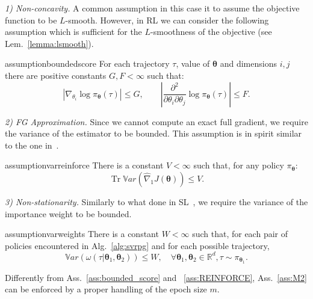 \documentclass{article}
\theoremstyle{remark}
\theoremstyle{definition}
\newcommand{\todopir}[1]{\todo[color=blued, inline]{\small #1}}
\newcommand{\realspace}{\mathbb R}      %
\DeclareMathOperator{\Tr}{Tr}
\newcommand{\vtheta}{\boldsymbol{\theta}}
\newcommand{\pol}{\pi_{\vtheta}}
\newcommand{\gradApp}[2]{\widehat{\nabla}_{#2}J(#1)}
\newcommand{\VARRF}{V}
\newcommand{\GRADLOG}{G}
\newcommand{\VARIS}{W}
\newcommand{\HESSLOG}{F}
\begin{document}
\textit{1) Non-concavity.} A common assumption in this case it to assume the objective function to be $L$-smooth.
However, in RL we can consider the following assumption which is sufficient for the $L$-smoothness of the objective (see Lem.~\ref{lemma:lsmooth}).
	\begin{restatable}{assumption}{boundedscore}\label{ass:bounded_score}
		For each trajectory $\tau$, value of $\vtheta$ and dimensions $i,j$ there are positive constants $G,F<\infty$ such that:
\[
		\left|\nabla_{\theta_i}\log\pi_{\vtheta}(\tau)\right| \leq \GRADLOG, \qquad
        \left|\frac{\partial^2}{\partial\theta_i\partial\theta_j}\log\pi_{\vtheta}(\tau)\right| \leq \HESSLOG.
\]
	\end{restatable}

\textit{2) FG Approximation.}
Since we cannot compute an exact full gradient, we require the variance of the estimator to be bounded.
This assumption is in spirit similar to the one in~\citep{harikandeh2015stopwasting}.
	\begin{restatable}{assumption}{varreinforce}\label{ass:REINFORCE}
		There is a constant $V<\infty$ such that, for any policy $\pol$:
		\[
		\Tr\mathbb{V}ar\left(\gradApp{\vtheta}{1}\right) \leq \VARRF.
		\]
        \todopir{Why 1 as subscript?}
	\end{restatable}

\textit{3) Non-stationarity.} 
Similarly to what done in SL~\citep{cortes2010learning}, we require the variance of the importance weight to be bounded.
	\begin{restatable}{assumption}{varweights}\label{ass:M2}
		There is a constant $W<\infty$ such that, for each pair of policies encountered in Alg.~\ref{alg:svrpg} and for each possible trajectory,
		\[
                \mathbb{V}ar\left(\omega(\tau| \vtheta_1, \vtheta_2)\right) \leq \VARIS, \quad \forall \vtheta_1,\vtheta_2 \in \realspace^d , \tau \sim \pi_{\vtheta_1}.
		\]
	\end{restatable}
Differently from Ass.~\ref{ass:bounded_score} and ~\ref{ass:REINFORCE}, Ass.~\ref{ass:M2} can be enforced by a proper handling of the epoch size $m$.
\end{document}
